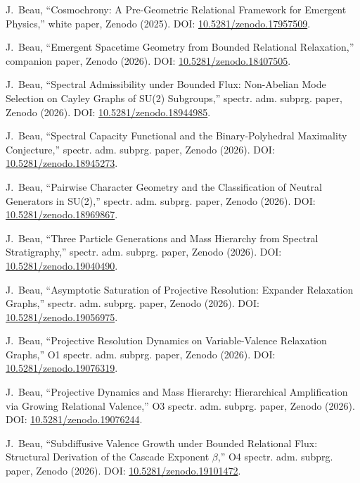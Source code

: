 J.~Beau,
``Cosmochrony: A Pre-Geometric Relational Framework for Emergent Physics,''
white paper, Zenodo (2025).
DOI: \href{https://doi.org/10.5281/zenodo.17957509}{10.5281/zenodo.17957509}.

J.~Beau,
``Emergent Spacetime Geometry from Bounded Relational Relaxation,''
companion paper, Zenodo (2026).
DOI: \href{https://doi.org/10.5281/zenodo.18407505}{10.5281/zenodo.18407505}.

J.~Beau,
``Spectral Admissibility under Bounded Flux: Non-Abelian Mode Selection on Cayley Graphs of SU(2) Subgroups,''
spectr. adm. subprg. paper, Zenodo (2026).
DOI: \href{https://doi.org/10.5281/zenodo.18944985}{10.5281/zenodo.18944985}.

J.~Beau,
``Spectral Capacity Functional and the Binary-Polyhedral Maximality Conjecture,''
spectr. adm. subprg. paper, Zenodo (2026).
DOI: \href{https://doi.org/10.5281/zenodo.18945273}{10.5281/zenodo.18945273}.

J.~Beau,
``Pairwise Character Geometry and the Classification of Neutral Generators in SU(2),''
spectr. adm. subprg. paper, Zenodo (2026).
DOI: \href{https://doi.org/10.5281/zenodo.18969867}{10.5281/zenodo.18969867}.

J.~Beau,
``Three Particle Generations and Mass Hierarchy from Spectral Stratigraphy,''
spectr. adm. subprg. paper, Zenodo (2026).
DOI: \href{https://doi.org/10.5281/zenodo.19040490}{10.5281/zenodo.19040490}.

J.~Beau,
``Asymptotic Saturation of Projective Resolution: Expander Relaxation Graphs,''
spectr. adm. subprg. paper, Zenodo (2026).
DOI: \href{https://doi.org/10.5281/zenodo.19056975}{10.5281/zenodo.19056975}.

J.~Beau,
``Projective Resolution Dynamics on Variable-Valence Relaxation Graphs,''
O1 spectr. adm. subprg. paper, Zenodo (2026).
DOI: \href{https://doi.org/10.5281/zenodo.19076319}{10.5281/zenodo.19076319}.

J.~Beau,
``Projective Dynamics and Mass Hierarchy: Hierarchical Amplification via Growing Relational Valence,''
O3 spectr. adm. subprg. paper, Zenodo (2026).
DOI: \href{https://doi.org/10.5281/zenodo.19076244}{10.5281/zenodo.19076244}.

J.~Beau,
``Subdiffusive Valence Growth under Bounded Relational Flux: Structural Derivation of the Cascade Exponent $\beta$,''
O4 spectr. adm. subprg. paper, Zenodo (2026).
DOI: \href{https://doi.org/10.5281/zenodo.19101472}{10.5281/zenodo.19101472}.


